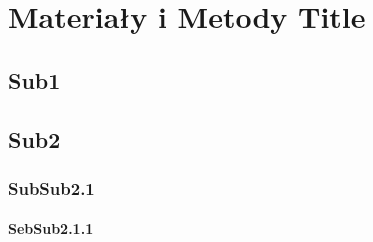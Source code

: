 

\chapter{Materiały i Metody Title}

\label{Label for title 3}

\section{Sub1}
\section{Sub2}
\subsection{SubSub2.1}
\subsubsection{SebSub2.1.1}
